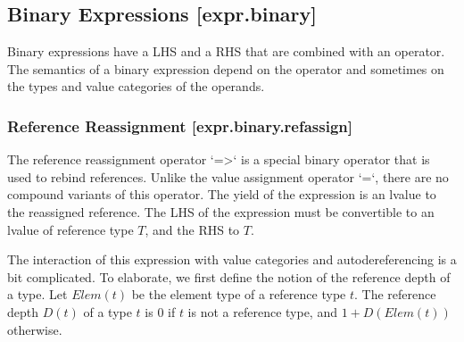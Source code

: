 \documentclass[a4paper, 12pt, oneside, final]{article}
\begin{document}
\subsection{Binary Expressions [expr.binary]}
Binary expressions have a LHS and a RHS that are combined with an operator. The semantics of
a binary expression depend on the operator and sometimes on the types and value categories of
the operands.

\subsubsection{Reference Reassignment [expr.binary.refassign]}
The reference reassignment operator `=>` is a special binary operator that is used to rebind references. Unlike
the value assignment operator `=`, there are no compound variants of this operator. The yield of the expression
is an lvalue to the reassigned reference. The LHS of the expression must be convertible to an lvalue of reference
type $T$, and the RHS to $T$.

The interaction of this expression with value categories and autodereferencing is a bit complicated.
To elaborate, we first define the notion of the reference depth of a type. Let $\mathit{Elem}(t)$ be the
element type of a reference type $t$. The reference depth $D(t)$ of a type $t$ is $0$ if $t$ is not a reference
type, and $1 + D(\mathit{Elem}(t))$ otherwise.
\end{document}
